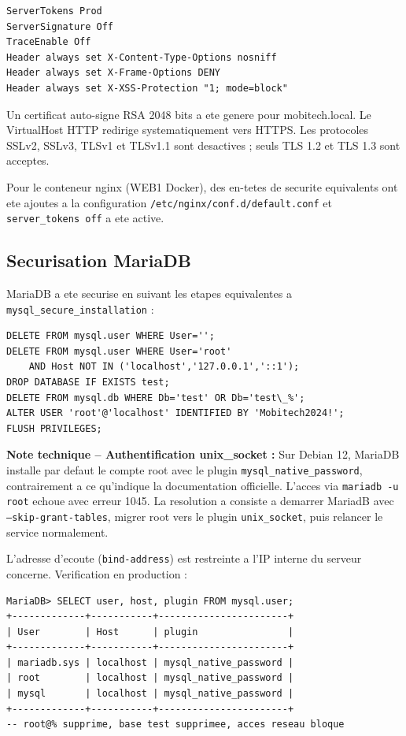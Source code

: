 \documentclass[11pt,a4paper]{article}
\newcommand{\infobox}[1]{\begin{tcolorbox}[colback=primarylight,colframe=primary!40,
  arc=4pt,boxrule=0.6pt,left=8pt,right=8pt,top=6pt,bottom=6pt,
  before skip=0.4em,after skip=0.4em]#1\end{tcolorbox}}
\begin{document}
\begin{lstlisting}[caption={Directives de securite Apache -- /etc/apache2/conf-enabled/security.conf}]
ServerTokens Prod
ServerSignature Off
TraceEnable Off
Header always set X-Content-Type-Options nosniff
Header always set X-Frame-Options DENY
Header always set X-XSS-Protection "1; mode=block"
\end{lstlisting}

Un certificat auto-signe RSA 2048 bits a ete genere pour mobitech.local. Le VirtualHost HTTP redirige systematiquement vers HTTPS. Les protocoles SSLv2, SSLv3, TLSv1 et TLSv1.1 sont desactives ; seuls TLS 1.2 et TLS 1.3 sont acceptes.

Pour le conteneur nginx (WEB1 Docker), des en-tetes de securite equivalents ont ete ajoutes a la configuration \texttt{/etc/nginx/conf.d/default.conf} et \texttt{server\_tokens off} a ete active.

\subsection{Securisation MariaDB}

MariaDB a ete securise en suivant les etapes equivalentes a \texttt{mysql\_secure\_installation} :

\begin{lstlisting}[caption={Securisation du compte root et suppression des donnees de test}]
DELETE FROM mysql.user WHERE User='';
DELETE FROM mysql.user WHERE User='root'
    AND Host NOT IN ('localhost','127.0.0.1','::1');
DROP DATABASE IF EXISTS test;
DELETE FROM mysql.db WHERE Db='test' OR Db='test\_%';
ALTER USER 'root'@'localhost' IDENTIFIED BY 'Mobitech2024!';
FLUSH PRIVILEGES;
\end{lstlisting}

\infobox{%
\textbf{Note technique -- Authentification unix\_socket :} Sur Debian 12, MariaDB installe par defaut le compte root avec le plugin \texttt{mysql\_native\_password}, contrairement a ce qu'indique la documentation officielle. L'acces via \texttt{mariadb -u root} echoue avec erreur 1045. La resolution a consiste a demarrer MariadB avec \texttt{--skip-grant-tables}, migrer root vers le plugin \texttt{unix\_socket}, puis relancer le service normalement.
}

L'adresse d'ecoute (\texttt{bind-address}) est restreinte a l'IP interne du serveur concerne. Verification en production :

\begin{lstlisting}[caption={Sortie reelle -- comptes MariaDB sur AD-LDAP apres securisation}]
MariaDB> SELECT user, host, plugin FROM mysql.user;
+-------------+-----------+-----------------------+
| User        | Host      | plugin                |
+-------------+-----------+-----------------------+
| mariadb.sys | localhost | mysql_native_password |
| root        | localhost | mysql_native_password |
| mysql       | localhost | mysql_native_password |
+-------------+-----------+-----------------------+
-- root@% supprime, base test supprimee, acces reseau bloque
\end{lstlisting}
\end{document}
